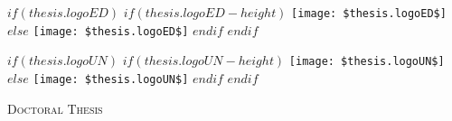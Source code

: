 \frontmatter

\pagestyle{plain}

\begin{titlepage}

\noindent
\begin{minipage}[t]{0.4\textwidth}
  \begin{flushleft} \large
    $if(thesis.logoED)$
      $if(thesis.logoED-height)$
        \texttt{[image: \$thesis.logoED\$]} %
      $else$
        \texttt{[image: \$thesis.logoED\$]}
      $endif$
    $endif$
  \end{flushleft}
\end{minipage}
\hfill
\begin{minipage}[t]{0.4\textwidth}
  \begin{flushright} \large
    $if(thesis.logoUN)$
      $if(thesis.logoUN-height)$
        \texttt{[image: \$thesis.logoUN\$]} %
      $else$
        \texttt{[image: \$thesis.logoUN\$]}
      $endif$
    $endif$
  \end{flushright}
\end{minipage}

\begin{center}

\vspace*{.06\textheight}

{\scshape\LARGE \univname\par}\vspace{1cm}

\textsc{\Large Doctoral Thesis}\\[0.5cm]

\HRule \\[0.4cm]
{\huge \bfseries \ttitle\par}\vspace{0.4cm}
\HRule \\[1.5cm]


\end{center}
\end{titlepage}
